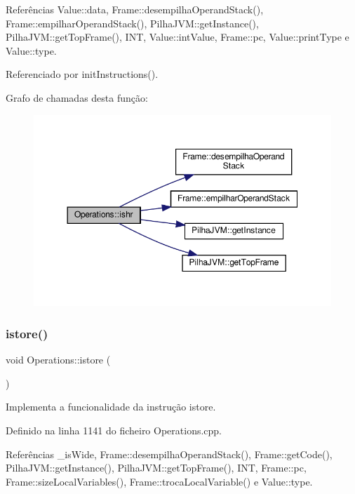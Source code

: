Referências Value\+::data, Frame\+::desempilha\+Operand\+Stack(), Frame\+::empilhar\+Operand\+Stack(), Pilha\+J\+V\+M\+::get\+Instance(), Pilha\+J\+V\+M\+::get\+Top\+Frame(), I\+NT, Value\+::int\+Value, Frame\+::pc, Value\+::print\+Type e Value\+::type.



Referenciado por init\+Instructions().

Grafo de chamadas desta função\+:\nopagebreak
\begin{figure}[H]
\begin{center}
\leavevmode
\includegraphics[width=350pt]{classOperations_aa67d92582121939b307658d417b34d3c_cgraph}
\end{center}
\end{figure}
\mbox{\label{classOperations_a1547cbd0fa84e551f218d472a5187efa}} 
\subsubsection{\texorpdfstring{istore()}{istore()}}
{\footnotesize\ttfamily void Operations\+::istore (\begin{DoxyParamCaption}{ }\end{DoxyParamCaption})\hspace{0.3cm}{\ttfamily [private]}}



Implementa a funcionalidade da instrução istore. 



Definido na linha 1141 do ficheiro Operations.\+cpp.



Referências \+\_\+is\+Wide, Frame\+::desempilha\+Operand\+Stack(), Frame\+::get\+Code(), Pilha\+J\+V\+M\+::get\+Instance(), Pilha\+J\+V\+M\+::get\+Top\+Frame(), I\+NT, Frame\+::pc, Frame\+::size\+Local\+Variables(), Frame\+::troca\+Local\+Variable() e Value\+::type.



